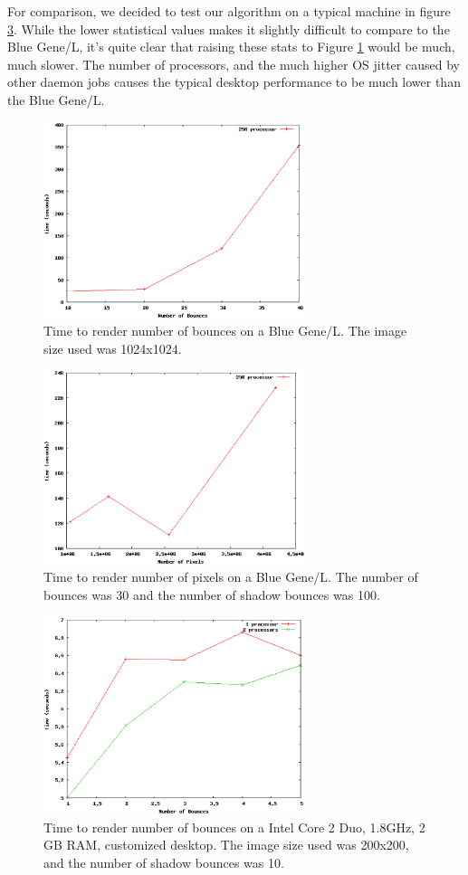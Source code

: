 \documentclass{acmsiggraph}
\begin{document}
For comparison, we decided to test our algorithm on a typical machine in figure 
\ref{plot_taro_desktop}.  While the lower statistical values makes it slightly
difficult to compare to the Blue Gene/L, it's quite clear that raising these stats
to Figure \ref{plot_bgl_bounces} would be much, much slower.  The number of processors,
and the much higher OS jitter caused by other daemon jobs causes the typical desktop
performance to be much lower than the Blue Gene/L.

\begin{figure}[tbp]
\centering
\includegraphics[width=3in]{blue_gene_bounces_plot}
\caption{Time to render number of bounces on a Blue Gene/L. The image size used was 1024x1024.}
\label{plot_bgl_bounces}
\end{figure}

\begin{figure}[tbp]
\centering
\includegraphics[width=3in]{blue_gene_pixels_plot}
\caption{Time to render number of pixels on a Blue Gene/L. The number of bounces was 30 and the number of shadow bounces was 100.}
\label{plot_bgl_pixels}
\end{figure}

\begin{figure}[tbp]
\centering
\includegraphics[width=3in]{taro_desktop_plot}
\caption{Time to render number of bounces on a Intel Core 2 Duo, 1.8GHz, 2 GB RAM, customized desktop. The image size used was 200x200, and the number of shadow bounces was 10.}
\label{plot_taro_desktop}
\end{figure}
\end{document}
